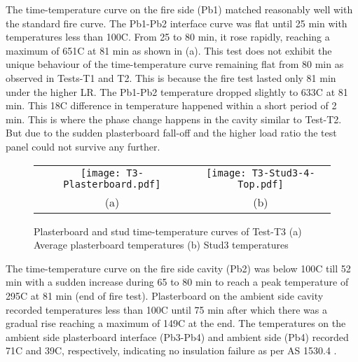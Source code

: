 The time-temperature curve on the fire side (Pb1) matched reasonably well with the standard fire curve. The Pb1-Pb2 interface curve was flat until 25 min with temperatures less than 100\degree C. From 25 to 80 min, it rose rapidly, reaching a maximum of 651\degree C at 81 min as shown in  (a). This test does not exhibit the unique behaviour of the time-temperature curve remaining flat from 80 min as observed in Tests-T1 and T2. This is because the fire test lasted only 81 min under the higher LR. The Pb1-Pb2 temperature dropped slightly to 633\degree C at 81 min. This 18\degree C difference in temperature happened within a short period of 2 min. This is where the phase change happens in the cavity similar to Test-T2. But due to the sudden plasterboard fall-off and the higher load ratio the test panel could not survive any further.
	\begin{figure}[!htbp]
		\centering
			\begin{tabular}{cc}
				\texttt{[image: T3-Plasterboard.pdf]} & \texttt{[image: T3-Stud3-4-Top.pdf]} \\ 
				(a) & (b)  \\ 
			\end{tabular} 
			\caption{Plasterboard and stud time-temperature curves of Test-T3 (a) Average plasterboard temperatures (b) Stud3 temperatures}
			\label{fig:T3-PB-Stud}
	\end{figure}

The time-temperature curve on the fire side cavity (Pb2) was below 100\degree C till 52 min with a sudden increase during 65 to 80 min to reach a peak temperature of 295\degree C at 81 min (end of fire test). Plasterboard on the ambient side cavity recorded temperatures less than 100\degree C until 75 min after which there was a gradual rise reaching a maximum of 149\degree C at the end. The temperatures on the ambient side plasterboard interface (Pb3-Pb4) and ambient side (Pb4) recorded 71\degree C and 39\degree C, respectively, indicating no insulation failure as per AS 1530.4 \citet{StandardsAustral2014}.

